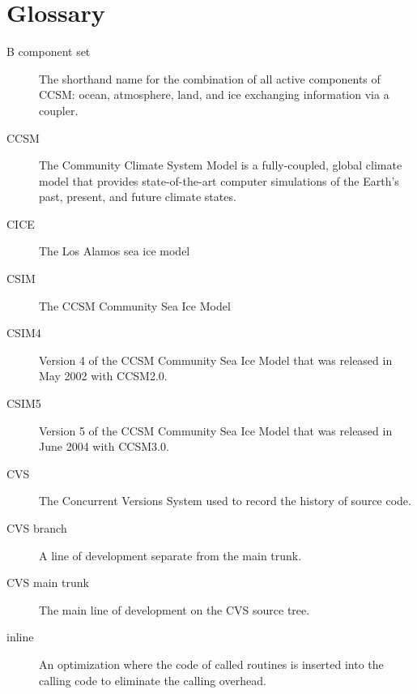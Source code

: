 \section{Glossary}

%
% 
%
%
%

\begin{description}

\item [B component set] The shorthand name for the combination of all
                        active components of CCSM:  ocean, atmosphere,
                        land, and ice exchanging information via a coupler.

\item [CCSM] The Community Climate System Model is a fully-coupled,
             global climate model that provides state-of-the-art computer
             simulations of the Earth's past, present, and future climate
             states.

\item [CICE] The Los Alamos sea ice model

\item [CSIM] The CCSM Community Sea Ice Model 

\item [CSIM4] Version 4 of the CCSM Community Sea Ice Model that
              was released in May 2002 with CCSM2.0.

\item [CSIM5] Version 5 of the CCSM Community Sea Ice Model that
              was released in June 2004 with CCSM3.0.

\item [CVS]  The Concurrent Versions System used to record the
             history of source code.

\item [CVS branch] A line of development separate from the main trunk.

\item [CVS main trunk] The main line of development
                        on the CVS source tree.

\item [inline] An optimization where the code of called routines
               is inserted into the calling code to eliminate the calling overhead.


\end{description}
